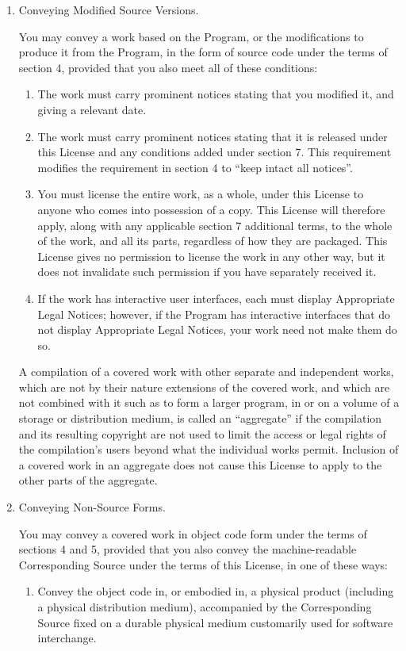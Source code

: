 \begin{enumerate}
\item Conveying Modified Source Versions.

You may convey a work based on the Program, or the modifications to
produce it from the Program, in the form of source code under the
terms of section 4, provided that you also meet all of these conditions:
  \begin{enumerate}
  \item The work must carry prominent notices stating that you modified
  it, and giving a relevant date.

  \item The work must carry prominent notices stating that it is
  released under this License and any conditions added under section
  7.  This requirement modifies the requirement in section 4 to
  ``keep intact all notices''.

  \item You must license the entire work, as a whole, under this
  License to anyone who comes into possession of a copy.  This
  License will therefore apply, along with any applicable section 7
  additional terms, to the whole of the work, and all its parts,
  regardless of how they are packaged.  This License gives no
  permission to license the work in any other way, but it does not
  invalidate such permission if you have separately received it.

  \item If the work has interactive user interfaces, each must display
  Appropriate Legal Notices; however, if the Program has interactive
  interfaces that do not display Appropriate Legal Notices, your
  work need not make them do so.
\end{enumerate}
A compilation of a covered work with other separate and independent
works, which are not by their nature extensions of the covered work,
and which are not combined with it such as to form a larger program,
in or on a volume of a storage or distribution medium, is called an
``aggregate'' if the compilation and its resulting copyright are not
used to limit the access or legal rights of the compilation's users
beyond what the individual works permit.  Inclusion of a covered work
in an aggregate does not cause this License to apply to the other
parts of the aggregate.

\item Conveying Non-Source Forms.

You may convey a covered work in object code form under the terms
of sections 4 and 5, provided that you also convey the
machine-readable Corresponding Source under the terms of this License,
in one of these ways:
  \begin{enumerate}
  \item Convey the object code in, or embodied in, a physical product
  (including a physical distribution medium), accompanied by the
  Corresponding Source fixed on a durable physical medium
  customarily used for software interchange.


\end{enumerate}
\end{enumerate}

